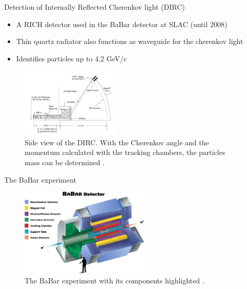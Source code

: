 \documentclass[aspectratio=1610, 10pt]{beamer}
\begin{document}
\begin{frame}{Detection of Internally Reflected Cherenkov light (DIRC)}
  \begin{itemize}
    \item A RICH detector used in the BaBar detector at SLAC (until 2008)
    \medskip
    \item Thin quartz radiator also functions as waveguide for the cherenkov light
    \medskip
    \item Identifies particles up to 4.2 GeV/c
  \end{itemize}
  \begin{figure}
    \includegraphics[width=0.42\textwidth]{images/dirc.png}
    \caption{Side view of the DIRC. With the Cherenkov angle and the momentum calculated with the tracking chambers, the
    particles mass can be determined \cite{gaseous}.}
  \end{figure}
\end{frame}

\begin{frame}{The BaBar experiment}
  \begin{figure}
    \includegraphics[width=0.55\textwidth]{images/babar.jpg}
    \caption{The BaBar experiment with its components highlighted \cite{babar}.}
  \end{figure}
\end{frame}
\end{document}

